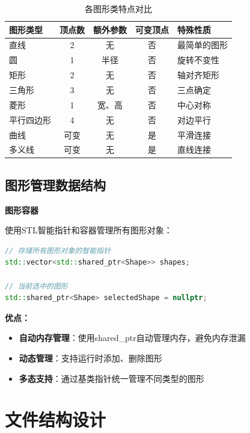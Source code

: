 \documentclass[12pt,a4paper]{article}
\begin{document}
\begin{table}[H]
\centering
\caption{各图形类特点对比}
\begin{tabular}{|l|c|c|c|p{4cm}|}
\hline
\textbf{图形类型} & \textbf{顶点数} & \textbf{额外参数} & \textbf{可变顶点} & \textbf{特殊性质} \\
\hline
直线 & 2 & 无 & 否 & 最简单的图形 \\
\hline
圆 & 1 & 半径 & 否 & 旋转不变性 \\
\hline
矩形 & 2 & 无 & 否 & 轴对齐矩形 \\
\hline
三角形 & 3 & 无 & 否 & 三点确定 \\
\hline
菱形 & 1 & 宽、高 & 否 & 中心对称 \\
\hline
平行四边形 & 4 & 无 & 否 & 对边平行 \\
\hline
曲线 & 可变 & 无 & 是 & 平滑连接 \\
\hline
多义线 & 可变 & 无 & 是 & 直线连接 \\
\hline
\end{tabular}
\end{table}

\subsection{图形管理数据结构}

\begin{tcolorbox}
\textbf{图形容器}

使用STL智能指针和容器管理所有图形对象：

\begin{lstlisting}[language=C++]
// 存储所有图形对象的智能指针
std::vector<std::shared_ptr<Shape>> shapes;

// 当前选中的图形
std::shared_ptr<Shape> selectedShape = nullptr;
\end{lstlisting}

\textbf{优点：}
\begin{itemize}
    \item \textbf{自动内存管理}：使用shared\_ptr自动管理内存，避免内存泄漏
    \item \textbf{动态管理}：支持运行时添加、删除图形
    \item \textbf{多态支持}：通过基类指针统一管理不同类型的图形
\end{itemize}
\end{tcolorbox}

\section{文件结构设计}
\end{document}

